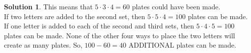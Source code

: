 \documentclass{article}
\theoremstyle{definition}
\newtheorem*{solution}{Solution}
\begin{document}
\begin{multicols}{2}
\begin{enumerate}
\begin{solution}
                This means that $5 \cdot 3 \cdot 4 = 60$ plates could have been made. \\
                If two letters are added to the second set, then $5 \cdot 5 \cdot 4 = 100$ plates can be made.
                If one letter is added to each of the second and third sets, then $5 \cdot 4 \cdot 5 = 100$ plates can be made.
                None of the other four ways to place the two letters will create as many plates.
                So, $100 - 60 = 40$ ADDITIONAL plates can be made.
            \end{solution}
    \end{enumerate}
\end{multicols}
\end{document}
